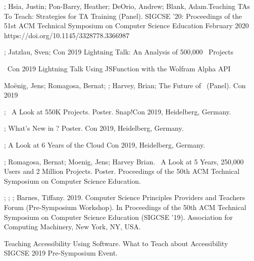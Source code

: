 \begin{etaremune}
    \item{\me; Hsia, Justin; Pon-Barry, Heather; DeOrio, Andrew; Blank, Adam.Teaching TAs To Teach: Strategies for TA Training (Panel). SIGCSE '20: Proceedings of the 51st ACM Technical Symposium on Computer Science Education February 2020
    \newline
    https://doi.org/10.1145/3328778.3366987}

    
    \item{\me; Jatzlau, Sven; \snap{}Con 2019 Lightning Talk: An Analysis of 500,000 \snap\ Projects}
    
    \item{\me\ \snap Con 2019 Lightning Talk Using JSFunction with the Wolfram Alpha API}
    
    \item{Moënig, Jens; Romagosa, Bernat; \me; Harvey, Brian; The Future of \snap\ (Panel). \snap Con 2019}
    
    
    \item{\me; \snap\ A Look at 550K Projects. Poster. Snap!Con 2019, Heidelberg, Germany.}
    
    \item{\me; What's New in ? Poster. \snap{}Con 2019, Heidelberg, Germany.}
    
    \item{\me; A Look at 6 Years of the \snap{}Cloud \snap{}Con 2019, Heidelberg, Germany.}
    
    
    \item{\me; Romagosa, Bernat; Moenig, Jens; Harvey Brian. \snap\ A Look at 5 Years, 250,000 Users and 2 Million Projects. Poster. Proceedings of the 50th ACM Technical Symposium on Computer Science Education.}
    
    \item{\lauren; \me; \dan; Barnes, Tiffany. 2019. Computer Science Principles Providers and Teachers Forum (Pre-Symposium Workshop). In Proceedings of the 50th ACM Technical Symposium on Computer Science Education (SIGCSE '19). Association for Computing Machinery, New York, NY, USA.}
    
    \item{\me Teaching Accessibility Using Software. What to Teach about Accessibility SIGCSE 2019 Pre-Symposium Event.}
    

\end{etaremune}
